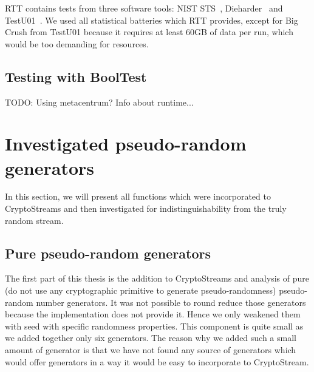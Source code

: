 \documentclass[
    digital,    %
    oneside,    %
    color,
    11pt,
    nocover,
    notable,
    nolof,
    nolot,
    final
]{fithesis3}
\renewcommand\_{\textunderscore\allowbreak}
\begin{document}
RTT contains tests from three software tools: {NIST STS}~\cite{nist-sts}, Dieharder~\cite{dieharder} and TestU01~\cite{l2007testu01}. We used all statistical batteries which RTT provides, except for Big Crush from TestU01 because it requires at least 60GB of data per run, which would be too demanding for resources. 

\subsection{Testing with BoolTest}

TODO: Using metacentrum? Info about runtime...

\section{Investigated pseudo-random generators}
\label{sec:added_pseudo_random_generators}

In this section, we will present all functions which were incorporated to CryptoStreams and then investigated for indistinguishability from the truly random stream.

\subsection{Pure pseudo-random generators}

The first part of this thesis is the addition to CryptoStreams and analysis of pure (do not use any cryptographic primitive to generate pseudo-randomness) pseudo-random number generators. It was not possible to round reduce those generators because the implementation does not provide it. Hence we only weakened them with seed with specific randomness properties. This component is quite small as we added together only six generators. The reason why we added such a small amount of generator is that we have not found any source of generators which would offer generators in a way it would be easy to incorporate to CryptoStream.
\end{document}
